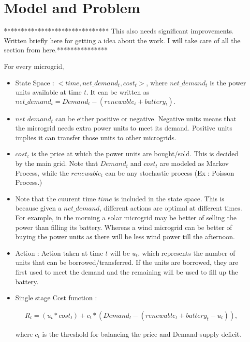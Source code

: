 \section{Model and Problem}

******************************* This also needs significant improvements. Written briefly here for getting a idea about the work. I will take care of all the section from here.***************

 For every microgrid, 
\begin{itemize}
	\item State Space : $<time, net\_demand_{t},cost_{t}>$, where $net\_demand_{t}$ is the power units available at time $t$. It can be written as $net\_demand_{t} = Demand_{t} - (renewable_{t} + battery_{t}).$
	
	\item $net\_demand_{t}$ can be either positive or negative. Negative units means that the microgrid needs extra power units to meet its demand. Positive units implies it can transfer those units to other microgrids. 
	
	\item $cost_{t}$ is the price at which the power units are bought/sold. This is decided by the main grid. Note that $Demand_{t}$ and $cost_{t}$ are modeled as Markov Process, while the $renewable_{t}$ can be any stochastic process (Ex : Poisson Process.)
	
	\item Note that the cuurent time $time$ is included in the state space. This is because given a $net\_demand$, different actions are optimal at different times. For example, in the morning a solar microgrid may be better of selling the power than filling its battery. Whereas a wind microgrid can be better of buying the power units as there will be less wind power till the afternoon. 
	
	\item Action : Action taken at time $t$ will be $u_{t}$, which represents the number of units that can be borrowed/transferred. If the units are borrowed, they are first used to meet the demand and the remaining will be used to fill up the battery. 
	
\end{itemize}

\begin{itemize}

\item Single stage Cost function : 

\begin{align}
R_t = (u_{t}*cost_{t}) + c_{t}*(Demand_{t} - (renewable_{t}+battery_{t}+u_{t})),
\end{align}

where $c_{t}$ is the threshold for balancing the price and Demand-supply deficit. 

\end{itemize}
